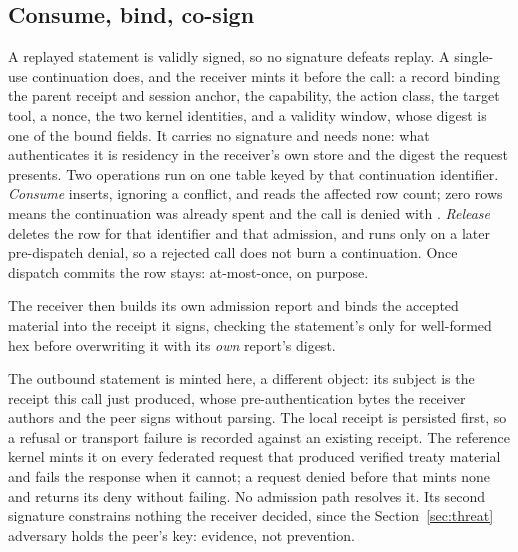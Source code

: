 

\subsection{Consume, bind, co-sign}

A replayed statement is validly signed, so no signature defeats replay. A
single-use continuation does, and the receiver mints it before the call: a
record binding the parent receipt and session anchor, the capability, the
action class, the target tool, a nonce, the two kernel identities, and a
validity window, whose digest is one of the \PSBindingFieldCount{} bound
fields. It carries no signature and needs none: what authenticates it is
residency in the receiver's own store and the digest the request presents.
Two operations run on one table keyed by that continuation identifier.
\emph{Consume} inserts, ignoring a conflict, and reads the affected row count;
zero rows means the continuation was already spent and the call is denied with
.
\emph{Release} deletes the row for that identifier and that admission, and
runs only on a later pre-dispatch denial, so a rejected call does not burn a
continuation. Once dispatch commits the row stays: at-most-once, on purpose.

The receiver then builds its own admission report and binds the accepted
material into the receipt it signs, checking the statement's
 only for well-formed hex before overwriting it
with its \emph{own} report's digest.

The outbound statement is minted here, a different object: its subject is the
receipt this call just produced, whose pre-authentication bytes the receiver
authors and the peer signs without parsing. The local receipt is persisted
first, so a refusal or transport failure is recorded against an existing
receipt. The reference kernel mints it on every federated request that
produced verified treaty material and fails the response when it cannot; a
request denied before that mints none and returns its deny without failing.
No admission path resolves it. Its second signature constrains nothing the
receiver decided, since the Section~\ref{sec:threat} adversary holds the
peer's key: evidence, not prevention.
